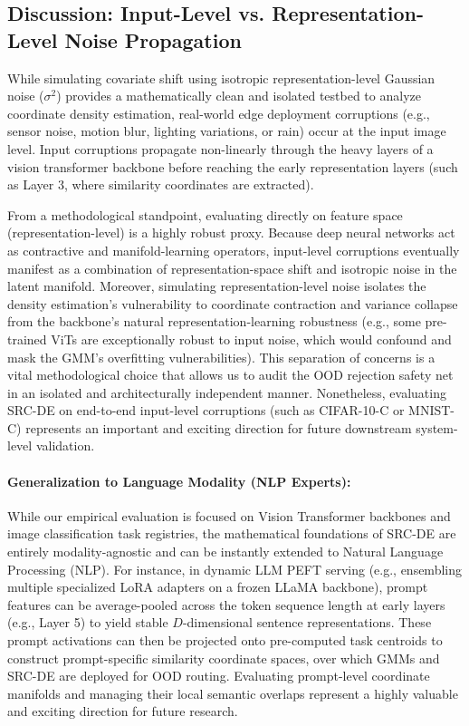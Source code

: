 \subsection{Discussion: Input-Level vs. Representation-Level Noise Propagation}
While simulating covariate shift using isotropic representation-level Gaussian noise ($\sigma^2$) provides a mathematically clean and isolated testbed to analyze coordinate density estimation, real-world edge deployment corruptions (e.g., sensor noise, motion blur, lighting variations, or rain) occur at the input image level. Input corruptions propagate non-linearly through the heavy layers of a vision transformer backbone before reaching the early representation layers (such as Layer 3, where similarity coordinates are extracted). 

From a methodological standpoint, evaluating directly on feature space (representation-level) is a highly robust proxy. Because deep neural networks act as contractive and manifold-learning operators, input-level corruptions eventually manifest as a combination of representation-space shift and isotropic noise in the latent manifold. Moreover, simulating representation-level noise isolates the density estimation's vulnerability to coordinate contraction and variance collapse from the backbone's natural representation-learning robustness (e.g., some pre-trained ViTs are exceptionally robust to input noise, which would confound and mask the GMM's overfitting vulnerabilities). This separation of concerns is a vital methodological choice that allows us to audit the OOD rejection safety net in an isolated and architecturally independent manner. Nonetheless, evaluating SRC-DE on end-to-end input-level corruptions (such as CIFAR-10-C or MNIST-C) represents an important and exciting direction for future downstream system-level validation.

\paragraph{Generalization to Language Modality (NLP Experts):} While our empirical evaluation is focused on Vision Transformer backbones and image classification task registries, the mathematical foundations of SRC-DE are entirely modality-agnostic and can be instantly extended to Natural Language Processing (NLP). For instance, in dynamic LLM PEFT serving (e.g., ensembling multiple specialized LoRA adapters on a frozen LLaMA backbone), prompt features can be average-pooled across the token sequence length at early layers (e.g., Layer 5) to yield stable $D$-dimensional sentence representations. These prompt activations can then be projected onto pre-computed task centroids to construct prompt-specific similarity coordinate spaces, over which GMMs and SRC-DE are deployed for OOD routing. Evaluating prompt-level coordinate manifolds and managing their local semantic overlaps represent a highly valuable and exciting direction for future research.

